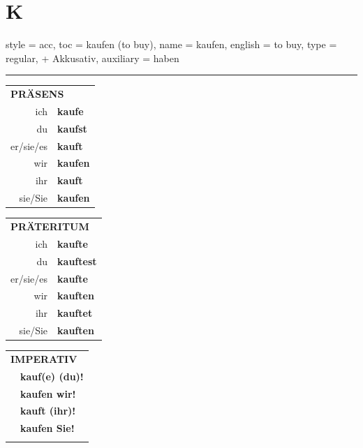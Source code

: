 \section{K}

\begin{verbentry}{
  style = {acc},
  toc = {kaufen (to buy)},
  name = {kaufen},
  english = {to buy},
  type = {regular, + Akkusativ},
  auxiliary = {haben}
}
 
    
     \vspace{5pt}

    \hrule
    
    \vspace{5pt}

  \begin{tabular}{rl}
     \multicolumn{2}{l}{\textbf{PRÄSENS} }\\
    ich & \textbf{kaufe}\\
    du & \textbf{kaufst}\\
    er/sie/es & \textbf{kauft}\\
    wir & \textbf{kaufen}\\
    ihr & \textbf{kauft}\\
    sie/Sie & \textbf{kaufen}\\
  \end{tabular}
  \hfill
     \begin{tabular}{rl}
    \multicolumn{2}{l}{\textbf{PRÄTERITUM} }\\
    ich & \textbf{kaufte}\\
    du & \textbf{kauftest}\\
    er/sie/es & \textbf{kaufte}\\
    wir & \textbf{kauften}\\
    ihr & \textbf{kauftet}\\
    sie/Sie & \textbf{kauften}\\
  \end{tabular}
  \hfill
  \begin{tabular}{rl}
     \multicolumn{2}{l}{\textbf{IMPERATIV} }\\
   & \textbf{kauf(e) (du)!}\\
   & \textbf{kaufen wir!}\\
   & \textbf{kauft (ihr)!}\\
   & \textbf{kaufen Sie!}\\
   & \vspace{10pt}
  \end{tabular}

    \vspace{10pt}


\end{verbentry}
